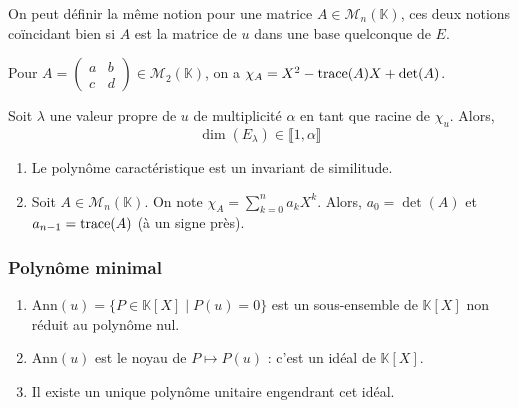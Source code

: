   \begin{remark}
    On peut définir la même notion pour une matrice $A \in \mathcal{M}_n(\mathbb{K})$, ces deux notions coïncidant bien si $A$ est la matrice de $u$ dans une base quelconque de $E$.
  \end{remark}

  \begin{example}
    Pour $A = \begin{pmatrix} a & b \\ c & d \end{pmatrix} \in \mathcal{M}_2(\mathbb{K})$, on a $\chi_A = X^2 - \operatorname{trace}(A)X + \det(A)$.
  \end{example}

  \begin{proposition}
    Soit $\lambda$ une valeur propre de $u$ de multiplicité $\alpha$ en tant que racine de $\chi_u$. Alors,
    \[ \dim(E_\lambda) \in \llbracket 1, \alpha \rrbracket \]
  \end{proposition}


  \begin{proposition}
    \begin{enumerate}[label={\bfseries(\roman*)}]
      \item Le polynôme caractéristique est un invariant de similitude.
      \item Soit $A \in \mathcal{M}_n(\mathbb{K})$. On note $\chi_A = \sum_{k=0}^n a_k X^k$. Alors, $a_0 = \det(A)$ et $a_{n-1} = \operatorname{trace}(A)$ (à un signe près).
    \end{enumerate}
  \end{proposition}

  \subsubsection{Polynôme minimal}


  \begin{lemma}
    \begin{enumerate}[label={\bfseries(\roman*)}]
      \item $\mathrm{Ann}(u) = \{ P \in \mathbb{K}[X] \mid P(u) = 0 \}$ est un sous-ensemble de $\mathbb{K}[X]$ non réduit au polynôme nul.
      \item $\mathrm{Ann}(u)$ est le noyau de $P \mapsto P(u)$ : c'est un idéal de $\mathbb{K}[X]$.
      \item Il existe un unique polynôme unitaire engendrant cet idéal.
    \end{enumerate}
  \end{lemma}

